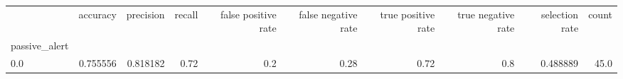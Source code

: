 \begin{tabular}{lrrrrrrrrr}
\toprule
{} &  accuracy &  precision &  recall &  false positive rate &  false negative rate &  true positive rate &  true negative rate &  selection rate &  count \\
passive\_alert &           &            &         &                      &                      &                     &                     &                 &        \\
\midrule
0.0           &  0.755556 &   0.818182 &    0.72 &                  0.2 &                 0.28 &                0.72 &                 0.8 &        0.488889 &   45.0 \\
\bottomrule
\end{tabular}
